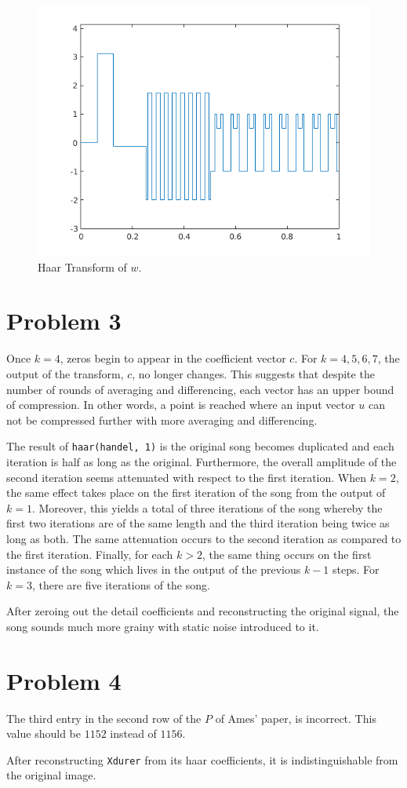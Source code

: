 \documentclass[paper=a4, fontsize=11pt]{scrartcl} %
\begin{document}
\begin{figure}[ht]
      \begin{minipage}[b]{0.5\linewidth}
          \centering
          \includegraphics[width=.5\linewidth]{haar_cat.png} 
          \caption{Haar Transform of $w$.} 
          \vspace{4ex}
      \end{minipage} 
  \end{figure}

\section*{Problem 3}

Once $k=4$, zeros begin to appear in the coefficient vector $c$.  For $k=4, 5,
6, 7$, the output of the transform, $c$, no longer changes. This suggests that
despite the number of rounds of averaging and differencing, each vector has an
upper bound of compression. In other words, a point is reached where an input
vector $u$ can not be compressed further with more averaging and differencing. 

\bigskip
The result of \texttt{haar(handel, 1)} is the original song becomes duplicated and
each iteration is half as long as the original.  Furthermore, the overall
amplitude of the second iteration seems attenuated with respect to the first
iteration. When $k=2$, the same effect takes place on the first iteration of
the song from the output of $k=1$. Moreover, this yields a total of three
iterations of the song whereby the first two iterations are of the same length
and the third iteration being twice as long as both. The same attenuation
occurs to the second iteration as compared to the first iteration.  Finally,
for each $k>2$, the same thing occurs on the first instance of the song which
lives in the output of the previous $k-1$ steps. For $k=3$, there are five
iterations of the song.

\bigskip
After zeroing out the detail coefficients and reconstructing the original
signal, the song sounds much more grainy with static noise introduced to it.


\section*{Problem 4}
The third entry in the second row of the $P$ of Ames' paper, is incorrect.
This value should be $1152$ instead of $1156$.

\bigskip
After reconstructing \texttt{Xdurer} from its haar coefficients, it is
indistinguishable from the original image.
\end{document}
